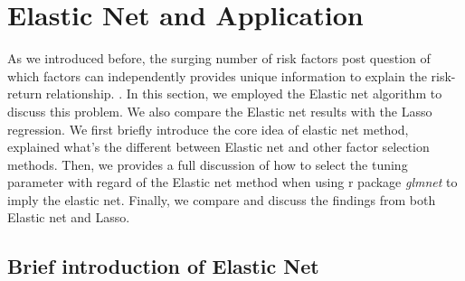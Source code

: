 \section{Elastic Net and Application}\label{Empirical:Elastic_net}
As we introduced before, the surging number of risk factors post question of which factors can independently provides unique information to explain the risk-return relationship. \cite{Cochrane2011}.
In this section, we employed the Elastic net algorithm to discuss this problem.
We also compare the Elastic net results with the Lasso regression.
We first briefly introduce the core idea of elastic net method, explained what's the different between Elastic net and other factor selection methods.
Then, we provides a full discussion of how to select the tuning parameter with regard of the Elastic net method when using r package \textit{glmnet} to imply the elastic net.
Finally, we compare and discuss the findings from both Elastic net and Lasso.


\subsection{Brief introduction of Elastic Net} \label{Elastic_Net}

